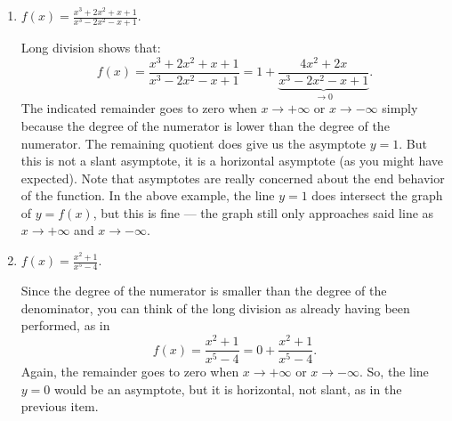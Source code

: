 \documentclass{ximera}
\begin{document}
\begin{example}
\begin{enumerate}
  \item $f(x) = \frac{x^3+2x^2+x+1}{x^3-2x^2-x+1}$. \\[1em]
   \begin{explanation}
      Long division shows that: $$   f(x) = \frac{x^3+2x^2+x+1}{x^3-2x^2-x+1} = 1 + \underbrace{\frac{4x^2+2x}{x^3-2x^2-x+1}}_{\to 0}.  $$The indicated remainder goes to zero when $x \to +\infty$ or $x\to -\infty$ simply because the degree of the numerator is lower than the degree of the numerator. The remaining quotient does give us the asymptote $y=1$. But this is not a slant asymptote, it is a horizontal asymptote (as you might have expected).
      Note that asymptotes are really concerned about the end behavior of the function. In the above example, the line $y=1$ does intersect the graph of $y=f(x)$, but this is fine --- the graph still only approaches said line as $x \to +\infty$ and $x \to -\infty$.
   \end{explanation}
  \item $f(x) = \frac{x^2+1}{x^5-4}$. \\[1em]
    \begin{explanation}
      Since the degree of the numerator is smaller than the degree of the denominator, you can think of the long division as already having been performed, as in $$ f(x) = \frac{x^2+1}{x^5-4} = 0 + \frac{x^2+1}{x^5-4}.  $$Again, the remainder goes to zero when $x \to +\infty$ or $x\to -\infty$. So, the line $y=0$ would be an asymptote, but it is horizontal, not slant, as in the previous item.

  \begin{image}
 \end{image}

      
    \end{explanation}
  \end{enumerate}

\end{example}
\end{document}
